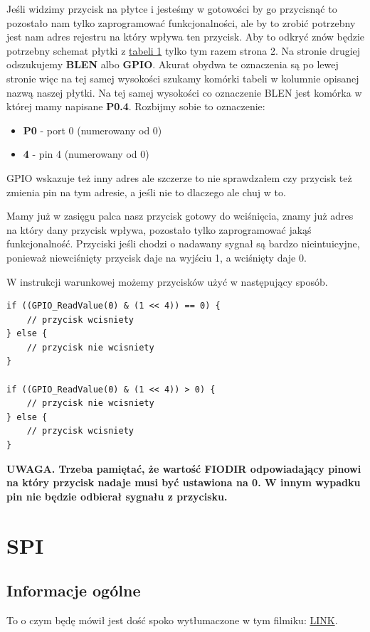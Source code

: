 \documentclass[11pt]{article}
\begin{document}
Jeśli widzimy przycisk na płytce i jesteśmy w gotowości by go przycisnąć to pozostało
nam tylko zaprogramować funkcjonalności, ale by to zrobić potrzebny jest nam adres
rejestru na który wpływa ten przycisk. Aby to odkryć znów będzie potrzebny schemat
płytki z \hyperref[tab:tab1]{tabeli 1} tylko tym razem strona 2. Na stronie drugiej
odszukujemy \textbf{BL\textunderscore EN} albo \textbf{GPIO}.
Akurat obydwa te oznaczenia są po lewej stronie więc na tej samej wysokości szukamy
komórki tabeli w kolumnie opisanej nazwą naszej płytki. Na tej samej wysokości co 
oznaczenie BL\textunderscore EN jest komórka w której mamy napisane \textbf{P0.4}.
Rozbijmy sobie to oznaczenie:
\begin{itemize}
    \item \textbf{P0} - port 0 (numerowany od 0)
    \item \textbf{4} - pin 4 (numerowany od 0)
\end{itemize}
GPIO wskazuje też inny adres ale szczerze to nie sprawdzałem czy 
przycisk też zmienia pin na tym adresie, a jeśli nie to dlaczego ale chuj w to.

Mamy już w zasięgu palca nasz przycisk gotowy do wciśnięcia, znamy już adres na który
dany przycisk wpływa, pozostało tylko zaprogramować jakąś funkcjonalność. 
Przyciski jeśli chodzi o nadawany sygnał są bardzo nieintuicyjne, ponieważ niewciśnięty
przycisk daje na wyjściu 1, a wciśnięty daje 0. 

W instrukcji warunkowej możemy przycisków użyć w następujący sposób.
\begin{lstlisting}
if ((GPIO_ReadValue(0) & (1 << 4)) == 0) {
    // przycisk wcisniety
} else {
    // przycisk nie wcisniety
}

if ((GPIO_ReadValue(0) & (1 << 4)) > 0) {
    // przycisk nie wcisniety
} else {
    // przycisk wcisniety
}
\end{lstlisting}
\textbf{UWAGA. Trzeba pamiętać, że wartość FIODIR odpowiadający pinowi na który
przycisk nadaje musi być ustawiona na 0. W innym wypadku pin nie będzie odbierał sygnału
z przycisku.}

\section{SPI}
\subsection{Informacje ogólne}
To o czym będę mówił jest dość spoko wytłumaczone w tym filmiku: \href{https://www.youtube.com/watch?v=0nVNwozXsIc&ab_channel=Rohde%26Schwarz}{LINK}.
\end{document}

